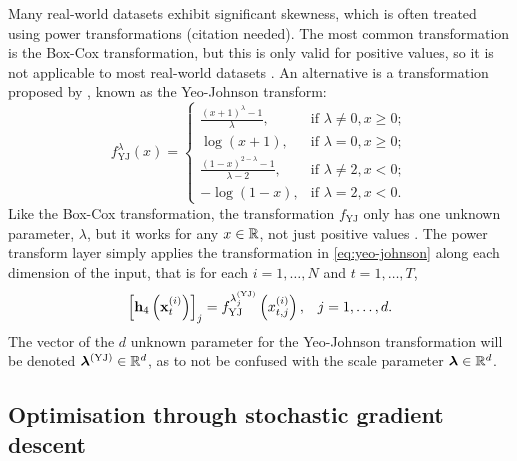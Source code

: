 \documentclass{statsmsc}
\begin{document}
{Many real-world datasets exhibit significant skewness, which is often treated using power
transformations (citation needed). The most common transformation is the Box-Cox transformation,
but this is only valid for positive values, so it is not applicable to most real-world datasets
\citep{boxcox}. An alternative is a transformation proposed by \cite{yeoJohnson},
known as the Yeo-Johnson transform:
\begin{equation}\label{eq:yeo-johnson}
    f_{\textrm{YJ}}^\lambda(x)= \left\{
        \begin{array}{ll}
            \frac{(x+1)^{\lambda}-1}{\lambda}, & \textrm{if } \lambda \neq 0, x \geq 0; \\
            \log(x + 1), & \textrm{if } \lambda = 0, x \geq 0;  \\
            \frac{(1-x)^{2-\lambda}-1}{\lambda-2} , & \textrm{if } \lambda \neq 2, x < 0; \\
            -\log(1-x), & \textrm{if } \lambda=2, x < 0.
        \end{array}
    \right.
\end{equation}
Like the Box-Cox transformation, the transformation $f_{\textrm{YJ}}$ only has one unknown parameter, $\lambda$, but
it works for any $x \in \mathbb{R}$, not just positive values \citep{yeoJohnson}.
The power transform layer simply applies the transformation in \cref{eq:yeo-johnson} along each dimension of the input, that is for each $i=1,\dots,N$ and $t=1,\dots,T$,
\begin{equation}
    \left[\mathbf{h}_4\left(\mathbf{x}_t^{(i)}\right)\right]_j=f^{\lambda_j^{(\textrm{YJ})}}_{\textrm{YJ}}\left(x_{t,j}^{(i)}\right), \;\;\; j=1,\dots,d.
\end{equation}
The vector of the $d$ unknown parameter for the Yeo-Johnson transformation will be
denoted $\bm\lambda^{(\textrm{YJ})} \in \mathbb{R}^d$, as to not be confused with the scale parameter
$\bm\lambda \in \mathbb{R}^d$.



\subsection{Optimisation through stochastic gradient descent}%
\label{sub:edain_opt_sgd}

}
\end{document}
